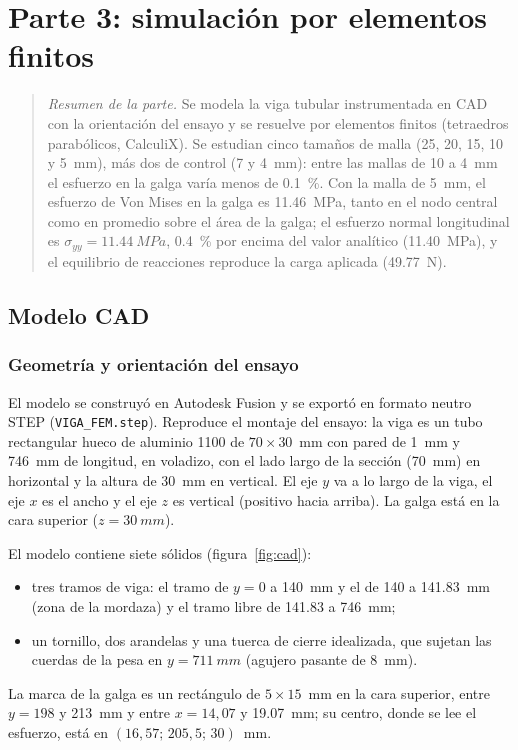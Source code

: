 \documentclass[11pt,a4paper]{article}
\begin{document}
\section{Parte 3: simulaci\'on por elementos finitos}
\begin{quote}\small\textit{Resumen de la parte.} Se modela la viga tubular instrumentada en CAD con la orientaci\'on del ensayo y se resuelve por elementos finitos (tetraedros parab\'olicos, CalculiX). Se estudian cinco tama\~nos de malla (25, 20, 15, 10 y \SI{5}{mm}), m\'as dos de control (7 y \SI{4}{mm}): entre las mallas de 10 a \SI{4}{mm} el esfuerzo en la galga var\'ia menos de \SI{0,1}{\percent}. Con la malla de \SI{5}{mm}, el esfuerzo de Von Mises en la galga es \SI{11,46}{MPa}, tanto en el nodo central como en promedio sobre el \'area de la galga; el esfuerzo normal longitudinal es $\sigma_{yy}=\SI{11,44}{MPa}$, \SI{0,4}{\percent} por encima del valor anal\'itico (\SI{11,40}{MPa}), y el equilibrio de reacciones reproduce la carga aplicada (\SI{49,77}{N}).\end{quote}

\subsection{Modelo CAD}
\subsubsection{Geometr\'ia y orientaci\'on del ensayo}
El modelo se construy\'o en Autodesk Fusion y se export\'o en formato neutro STEP (\texttt{VIGA\_FEM.step}). Reproduce el montaje del ensayo: la viga es un tubo rectangular hueco de aluminio 1100 de $70\times30$~mm con pared de \SI{1}{mm} y \SI{746}{mm} de longitud, en voladizo, con el lado largo de la secci\'on (\SI{70}{mm}) en horizontal y la altura de \SI{30}{mm} en vertical. El eje $y$ va a lo largo de la viga, el eje $x$ es el ancho y el eje $z$ es vertical (positivo hacia arriba). La galga est\'a en la cara superior ($z=\SI{30}{mm}$).

El modelo contiene siete s\'olidos (figura~\ref{fig:cad}):
\begin{itemize}
\item tres tramos de viga: el tramo de $y=0$ a \SI{140}{mm} y el de \SI{140}{} a \SI{141,83}{mm} (zona de la mordaza) y el tramo libre de \SI{141,83}{} a \SI{746}{mm};
\item un tornillo, dos arandelas y una tuerca de cierre idealizada, que sujetan las cuerdas de la pesa en $y=\SI{711}{mm}$ (agujero pasante de \SI{8}{mm}).
\end{itemize}
La marca de la galga es un rect\'angulo de $5\times15$~mm en la cara superior, entre $y=198$ y \SI{213}{mm} y entre $x=14{,}07$ y \SI{19,07}{mm}; su centro, donde se lee el esfuerzo, est\'a en $(16{,}57;\,205{,}5;\,30)$~mm.
\end{document}
